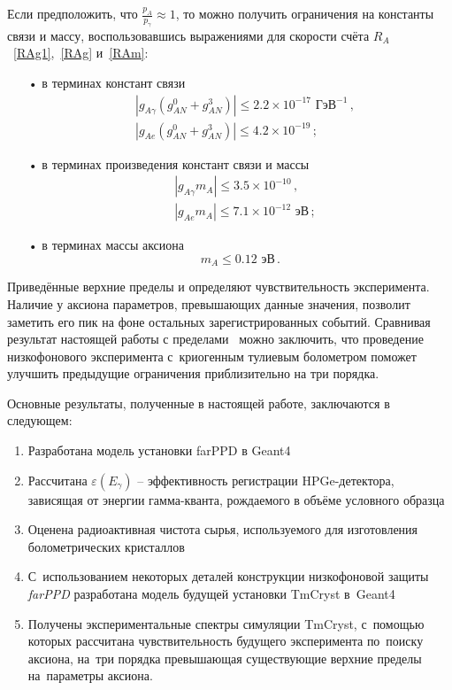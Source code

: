 \documentclass[a4paper,article,14pt]{extarticle}
\begin{document}
Если предположить, что $\frac{p_A}{p_\gamma} \approx 1$, то можно получить ограничения на константы связи и массу, воспользовавшись выражениями для скорости счёта ${R_A}$~\eqref{RAg1},~\eqref{RAg} и~\eqref{RAm}:
\begin{enumerate}
    \item[•] в терминах констант связи
        \begin{align}
            &\left|
                g_{A\gamma}{({g_{AN}^0 + g_{AN}^3})}
            \right| \leqslant
                2.2 \times 10^{-17} \text{ ГэВ}^{-1}\, ,\\
            &\left|
                g_{Ae}{({g_{AN}^0 + g_{AN}^3})}
            \right| \leqslant
                4.2 \times 10^{-19}\, ;\nonumber
          \end{align}
    \item[•] в терминах произведения констант связи и массы
        \begin{align}
            &\left|
                {{g_{A\gamma}}{m_A}}
            \right| \leqslant
                3.5 \times 10^{-10}\, ,\\
            &\left|
                g_{Ae} m_A
            \right| \leqslant
                7.1 \times 10^{-12} \text{ эВ}\, ;\nonumber
        \end{align}
    \item[•] в терминах массы аксиона
        \begin{equation}
            m_A \leqslant 0.12 \text{ эВ}\, .
        \end{equation}
\end{enumerate}

Приведённые верхние пределы и определяют чувствительность эксперимента.
Наличие у аксиона параметров, превышающих данные значения, позволит заметить его пик на фоне остальных зарегистрированных событий.
Сравнивая результат настоящей работы с пределами~\cite{newlimits_tm} можно заключить, что проведение низкофонового эксперимента с~криогенным тулиевым болометром поможет улучшить предыдущие ограничения приблизительно на три порядка.


Основные результаты, полученные в настоящей работе, заключаются в следующем:
\begin{enumerate}
    \item Разработана модель установки farPPD в Geant4
    \item Рассчитана $\varepsilon (E_{\gamma})$ -- эффективность регистрации HPGe-детектора, зависящая от энергии гамма-кванта, рождаемого в объёме условного образца
    \item Оценена радиоактивная чистота сырья, используемого для изготовления болометрических кристаллов {\Tm}
    \item С~использованием некоторых деталей конструкции низкофоновой защиты \textit{farPPD} разработана модель будущей установки TmCryst в~Geant4
    \item Получены экспериментальные спектры симуляции TmCryst, с~помощью которых рассчитана чувствительность будущего эксперимента по~поиску аксиона, на~три порядка превышающая существующие верхние пределы на~параметры аксиона.
\end{enumerate}
\end{document}

